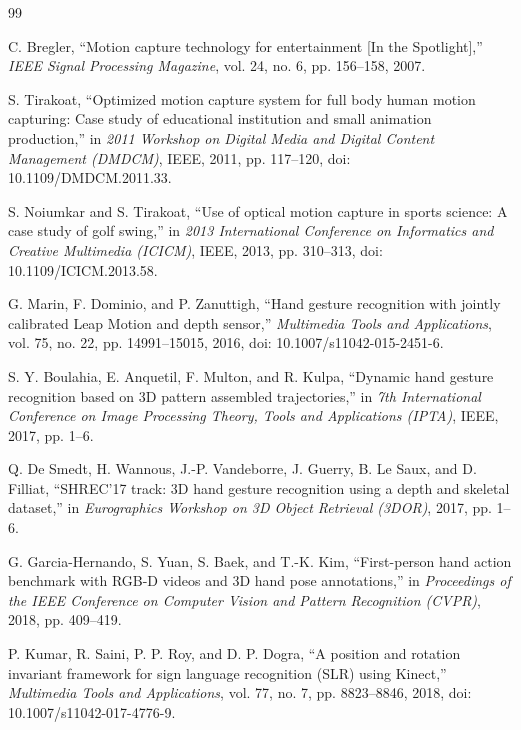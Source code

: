 \documentclass[10pt,twocolumn]{article}
\begin{document}
\vspace{-4pt}
\begin{thebibliography}{99}
\setlength{\itemsep}{0pt}\setlength{\parskip}{0pt}
\footnotesize

C. Bregler, ``Motion capture technology for entertainment [In the Spotlight],'' \textit{IEEE Signal Processing Magazine}, vol. 24, no. 6, pp. 156--158, 2007.

S. Tirakoat, ``Optimized motion capture system for full body human motion capturing: Case study of educational institution and small animation production,'' in \textit{2011 Workshop on Digital Media and Digital Content Management (DMDCM)}, IEEE, 2011, pp. 117--120, doi: 10.1109/DMDCM.2011.33.

S. Noiumkar and S. Tirakoat, ``Use of optical motion capture in sports science: A case study of golf swing,'' in \textit{2013 International Conference on Informatics and Creative Multimedia (ICICM)}, IEEE, 2013, pp. 310--313, doi: 10.1109/ICICM.2013.58.

G. Marin, F. Dominio, and P. Zanuttigh, ``Hand gesture recognition with jointly calibrated Leap Motion and depth sensor,'' \textit{Multimedia Tools and Applications}, vol. 75, no. 22, pp. 14991--15015, 2016, doi: 10.1007/s11042-015-2451-6.

S. Y. Boulahia, E. Anquetil, F. Multon, and R. Kulpa, ``Dynamic hand gesture recognition based on 3D pattern assembled trajectories,'' in \textit{7th International Conference on Image Processing Theory, Tools and Applications (IPTA)}, IEEE, 2017, pp. 1--6.

Q. De Smedt, H. Wannous, J.-P. Vandeborre, J. Guerry, B. Le Saux, and D. Filliat, ``SHREC'17 track: 3D hand gesture recognition using a depth and skeletal dataset,'' in \textit{Eurographics Workshop on 3D Object Retrieval (3DOR)}, 2017, pp. 1--6.

G. Garcia-Hernando, S. Yuan, S. Baek, and T.-K. Kim, ``First-person hand action benchmark with RGB-D videos and 3D hand pose annotations,'' in \textit{Proceedings of the IEEE Conference on Computer Vision and Pattern Recognition (CVPR)}, 2018, pp. 409--419.

P. Kumar, R. Saini, P. P. Roy, and D. P. Dogra, ``A position and rotation invariant framework for sign language recognition (SLR) using Kinect,'' \textit{Multimedia Tools and Applications}, vol. 77, no. 7, pp. 8823--8846, 2018, doi: 10.1007/s11042-017-4776-9.


\end{thebibliography}
\end{document}
